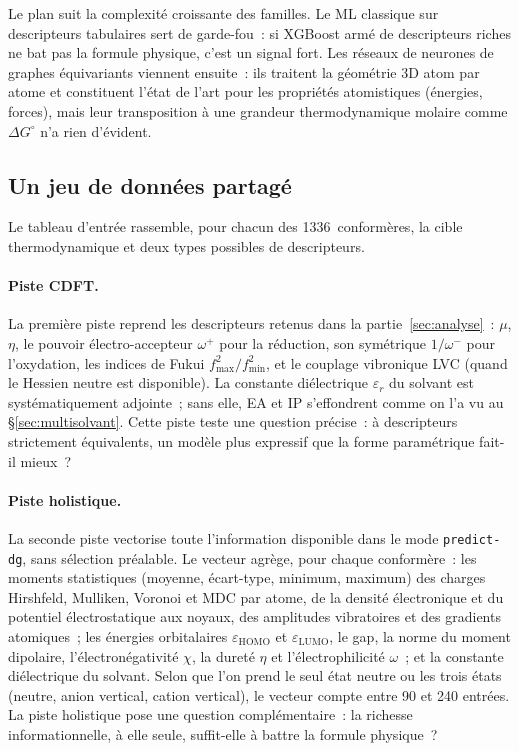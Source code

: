 Le plan suit la complexité croissante des familles. Le ML classique sur descripteurs tabulaires sert de garde-fou~: si XGBoost armé de descripteurs riches ne bat pas la formule physique, c'est un signal fort. Les réseaux de neurones de graphes équivariants viennent ensuite~: ils traitent la géométrie 3D atom par atome et constituent l'état de l'art pour les propriétés atomistiques (énergies, forces), mais leur transposition à une grandeur thermodynamique molaire comme $\Delta G^\circ$ n'a rien d'évident.

\subsection{Un jeu de données partagé}
\label{sec:ml_protocole}

Le tableau d'entrée rassemble, pour chacun des 1336~conformères, la cible thermodynamique et deux types possibles de descripteurs.

\paragraph{Piste CDFT.}
La première piste reprend les descripteurs retenus dans la partie~\ref{sec:analyse}~: $\mu$, $\eta$, le pouvoir électro-accepteur $\omega^+$ pour la réduction, son symétrique $1/\omega^-$ pour l'oxydation, les indices de Fukui $f^2_\text{max}/f^2_\text{min}$, et le couplage vibronique LVC (quand le Hessien neutre est disponible). La constante diélectrique $\varepsilon_r$ du solvant est systématiquement adjointe~; sans elle, EA et IP s'effondrent comme on l'a vu au §\ref{sec:multisolvant}. Cette piste teste une question précise~: à descripteurs strictement équivalents, un modèle plus expressif que la forme paramétrique fait-il mieux~?

\paragraph{Piste holistique.}
La seconde piste vectorise toute l'information disponible dans le mode \texttt{predict-dg}, sans sélection préalable. Le vecteur agrège, pour chaque conformère~: les moments statistiques (moyenne, écart-type, minimum, maximum) des charges Hirshfeld, Mulliken, Voronoi et MDC par atome, de la densité électronique et du potentiel électrostatique aux noyaux, des amplitudes vibratoires et des gradients atomiques~; les énergies orbitalaires $\varepsilon_\text{HOMO}$ et $\varepsilon_\text{LUMO}$, le gap, la norme du moment dipolaire, l'électronégativité $\chi$, la dureté $\eta$ et l'électrophilicité $\omega$~; et la constante diélectrique du solvant. Selon que l'on prend le seul état neutre ou les trois états (neutre, anion vertical, cation vertical), le vecteur compte entre 90 et 240 entrées. La piste holistique pose une question complémentaire~: la richesse informationnelle, à elle seule, suffit-elle à battre la formule physique~?

